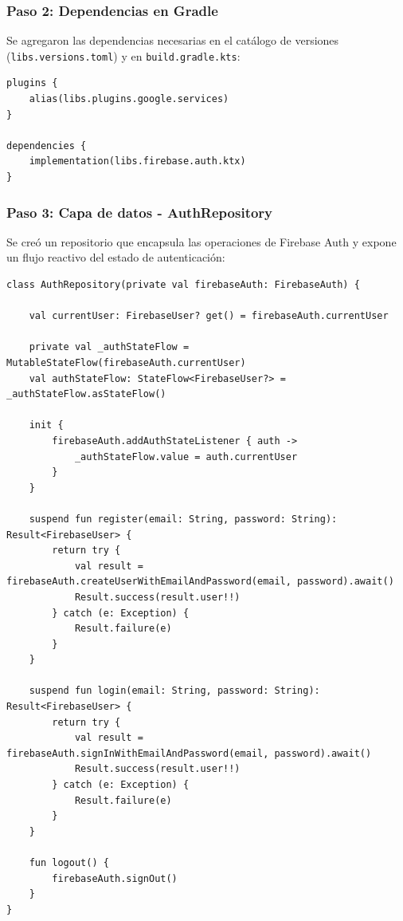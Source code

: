 \documentclass[12pt,a4paper]{article}
\begin{document}
\subsubsection{Paso 2: Dependencias en Gradle}

Se agregaron las dependencias necesarias en el catálogo de versiones (\texttt{libs.versions.toml}) y en \texttt{build.gradle.kts}:

\begin{lstlisting}[caption={Dependencias de Firebase en build.gradle.kts}]
plugins {
    alias(libs.plugins.google.services)
}

dependencies {
    implementation(libs.firebase.auth.ktx)
}
\end{lstlisting}

\subsubsection{Paso 3: Capa de datos - AuthRepository}

Se creó un repositorio que encapsula las operaciones de Firebase Auth y expone un flujo reactivo del estado de autenticación:

\begin{lstlisting}[caption={AuthRepository - Wrapper de Firebase Auth}]
class AuthRepository(private val firebaseAuth: FirebaseAuth) {

    val currentUser: FirebaseUser? get() = firebaseAuth.currentUser

    private val _authStateFlow = MutableStateFlow(firebaseAuth.currentUser)
    val authStateFlow: StateFlow<FirebaseUser?> = _authStateFlow.asStateFlow()

    init {
        firebaseAuth.addAuthStateListener { auth ->
            _authStateFlow.value = auth.currentUser
        }
    }

    suspend fun register(email: String, password: String): Result<FirebaseUser> {
        return try {
            val result = firebaseAuth.createUserWithEmailAndPassword(email, password).await()
            Result.success(result.user!!)
        } catch (e: Exception) {
            Result.failure(e)
        }
    }

    suspend fun login(email: String, password: String): Result<FirebaseUser> {
        return try {
            val result = firebaseAuth.signInWithEmailAndPassword(email, password).await()
            Result.success(result.user!!)
        } catch (e: Exception) {
            Result.failure(e)
        }
    }

    fun logout() {
        firebaseAuth.signOut()
    }
}
\end{lstlisting}
\end{document}

